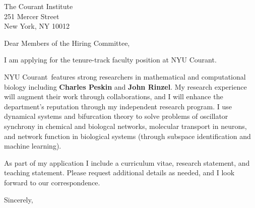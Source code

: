 \documentclass[11pt,a4paper]{letter}
\begin{document}
\def\School{NYU Courant}
\begin{letter}
{The Courant Institute\\
251 Mercer Street\\
New York, NY 10012}


\opening{Dear Members of the Hiring Committee,}

I am applying for the tenure-track faculty position at \School. 



\School~features strong researchers in mathematical and computational biology including \textbf{Charles Peskin} and \textbf{John Rinzel}. My research experience will augment their work through collaborations, and I will enhance the department's reputation through my independent research program. I use dynamical systems and bifurcation theory to solve problems of oscillator synchrony in chemical and biologcal networks, molecular transport in neurons, and network function in biological systems (through subspace identification and machine learning).



As part of my application I include a curriculum vitae, research statement, and teaching statement. Please request additional details as needed, and I look forward to our correspondence.

\closing{Sincerely,}
\end{letter}
\end{document}
